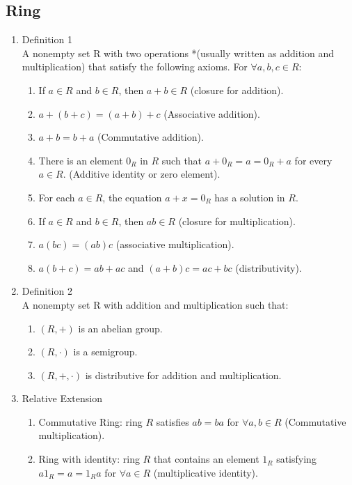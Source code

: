 \documentclass[letter]{article}
\begin{document}
\subsection{Ring}
\begin{enumerate}
	\item Definition 1\\
	A nonempty set R with two operations *(usually written as addition and multiplication) that satisfy the
	following axioms. For $\forall a,b,c\in R$:
	\begin{enumerate}
		\item If $a\in R$ and $b\in R$, then $a+b\in R$ (closure for addition).
		\item $a+(b+c)=(a+b)+c$ (Associative addition).
		\item $a+b=b+a$ (Commutative addition).
		\item There is an element $0_R$ in $R$ such that $a+0_R=a=0_R+a$ for every $a\in R$. (Additive identity or zero element).
		\item For each $a\in R$, the equation $a+x=0_R$ has a solution in $R$.
		\item If $a\in R$ and $b\in R$, then $ab\in R$ (closure for multiplication).
		\item $a(bc)=(ab)c$ (associative multiplication).
		\item $a(b+c)=ab+ac$ and $(a+b)c=ac+bc$ (distributivity).
	\end{enumerate}
	\item Definition 2\\
	A nonempty set R with addition and multiplication such that:
	\begin{enumerate}
		\item $(R,+)$ is an abelian group.
		\item $(R,\cdot)$ is a semigroup.
		\item $(R,+,\cdot)$ is distributive for addition and multiplication.
	\end{enumerate}
	\item Relative Extension
	\begin{enumerate}
		\item Commutative Ring: ring $R$ satisfies $ab=ba$ for $\forall a,b \in R$ (Commutative multiplication).
		\item Ring with identity: ring $R$ that contains an element $1_R$ satisfying $a1_R=a=1_Ra$ for $\forall a\in R$ (multiplicative identity).
	\end{enumerate}
\end{enumerate}
\end{document}
